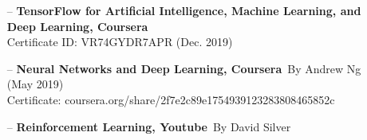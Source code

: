 





\dotfill


\dotfill



\begin{itemize}
    \item[--] \textbf{TensorFlow for Artificial
Intelligence, Machine Learning, and Deep
Learning, Coursera} \\Certificate ID: VR74GYDR7APR (Dec. 2019)
    \item[--] \textbf{Neural Networks and Deep Learning, Coursera} \,By Andrew Ng (May 2019)\\Certificate: coursera.org/share/2f7e2c89e1754939123283808465852c
    \item[--] \textbf{Reinforcement Learning, Youtube} \,By David Silver
\end{itemize}



